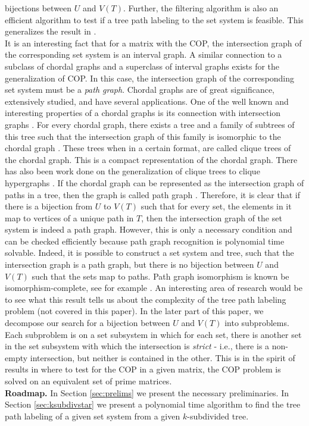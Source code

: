 \documentclass{CRPITStyle} %
\renewcommand{\cite}{\citep}%
\def\xnoindent{} %
\begin{document}
bijections between $U$ and $V(T)$.  Further, the filtering algorithm
is also an efficient algorithm to test if a tree path labeling to the
set system is feasible.  This
generalizes the result in \cite{nsnrs09}.\\
\xnoindent
It is an interesting fact that for a matrix with the COP, the
intersection graph of the corresponding set system is an interval
graph.  A similar connection to a subclass of chordal graphs and a
superclass of interval graphs exists for the generalization of COP.
In this case, the intersection graph of the corresponding set system
must be a {\em path graph}. Chordal graphs are of great significance,
extensively studied, and have several applications.  One of the well
known and interesting properties of a chordal graphs is its connection
with intersection graphs \cite{mcg04}. For every chordal graph, there
exists a tree and a family of subtrees of this tree such that the
intersection graph of this family is isomorphic to the chordal graph
\cite{plr70,gav78,bp93}.  These trees when in a certain format, are
called clique trees \cite{apy92} of the chordal graph. This is a
compact representation of the chordal graph. There has also been work
done on the generalization of clique trees to clique hypergraphs
\cite{km02}.  If the chordal graph can be represented as the
intersection graph of paths in a tree, then the graph is called path
graph \cite{mcg04}.  Therefore, it is clear that if there is a
bijection from $U$ to $V(T)$ such that for every set, the elements in
it map to vertices of a unique path in $T$, then the intersection
graph of the set system is indeed a path graph.  However, this is only
a necessary condition and can be checked efficiently because path
graph recognition is polynomial time
solvable\cite{gav78,aas93}. Indeed, it is possible to construct a set
system and tree, such that the intersection graph is a path graph, but
there is no bijection between $U$ and $V(T)$ such that the sets map to
paths. Path graph isomorphism is known be isomorphism-complete, see
for example \cite{kklv10}. An interesting area of research would be to
see what this result tells us about the complexity of the tree path
labeling problem (not covered in this paper). In the later part of
this paper, we decompose our search for a bijection between $U$ and
$V(T)$ into subproblems.  Each subproblem is on a set subsystem in
which for each set, there is another set in the set subsystem with
which the intersection is {\em strict} - i.e., there is a non-empty
intersection, but neither is contained in the other.  This is in the
spirit of results in \cite{wlh02,nsnrs09} where to test for the COP in
a given matrix,
the COP problem is solved on an equivalent set of prime matrices.  \\
{\bf Roadmap.} In Section \ref{sec:prelims} we present the necessary
preliminaries.
In Section \ref{sec:ksubdivstar} we present a polynomial time
algorithm to find the tree path labeling of a given set system from a
given $k$-subdivided tree.
\end{document}
